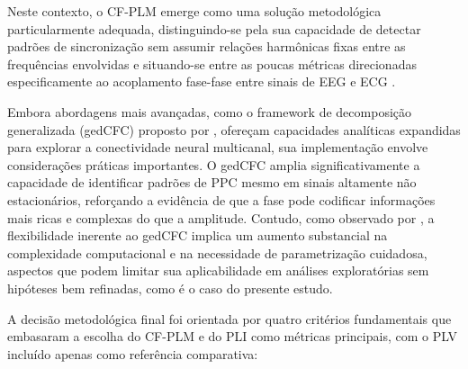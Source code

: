 Neste contexto, o CF-PLM emerge como uma solução metodológica particularmente adequada, distinguindo-se pela sua capacidade de detectar padrões de sincronização sem assumir relações harmônicas fixas entre as frequências envolvidas e situando-se entre as poucas métricas direcionadas especificamente ao acoplamento fase-fase entre sinais de EEG e ECG \cite{sorrentino2022detection}.

Embora abordagens mais avançadas, como o framework de decomposição generalizada (gedCFC) proposto por , ofereçam capacidades analíticas expandidas para explorar a conectividade neural multicanal, sua implementação envolve considerações práticas importantes. O gedCFC amplia significativamente a capacidade de identificar padrões de PPC mesmo em sinais altamente não estacionários, reforçando a evidência de que a fase pode codificar informações mais ricas e complexas do que a amplitude. Contudo, como observado por , a flexibilidade inerente ao gedCFC implica um aumento substancial na complexidade computacional e na necessidade de parametrização cuidadosa, aspectos que podem limitar sua aplicabilidade em análises exploratórias sem hipóteses bem refinadas, como é o caso do presente estudo.

A decisão metodológica final foi orientada por quatro critérios fundamentais que embasaram a escolha do CF-PLM e do PLI como métricas principais, com o PLV incluído apenas como referência comparativa:

